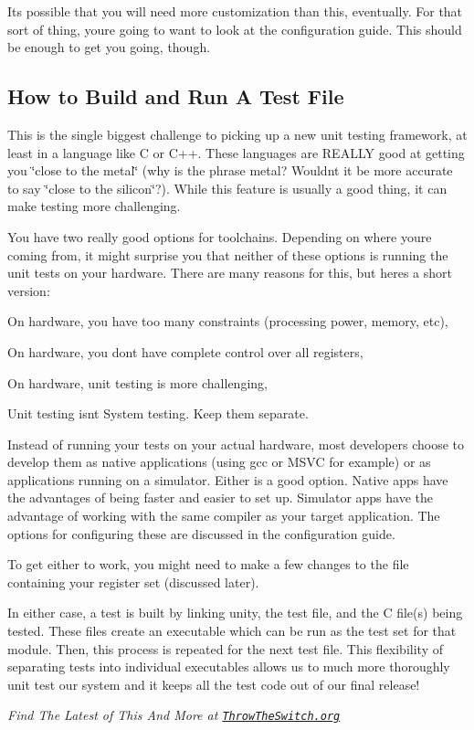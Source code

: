 It\textquotesingle{}s possible that you will need more customization than this, eventually. For that sort of thing, you\textquotesingle{}re going to want to look at the configuration guide. This should be enough to get you going, though.

\subsection*{How to Build and Run A Test File}

This is the single biggest challenge to picking up a new unit testing framework, at least in a language like C or C++. These languages are R\+E\+A\+L\+LY good at getting you \char`\"{}close to the metal\char`\"{} (why is the phrase metal? Wouldn\textquotesingle{}t it be more accurate to say \char`\"{}close to the silicon\char`\"{}?). While this feature is usually a good thing, it can make testing more challenging.

You have two really good options for toolchains. Depending on where you\textquotesingle{}re coming from, it might surprise you that neither of these options is running the unit tests on your hardware. There are many reasons for this, but here\textquotesingle{}s a short version\+:
\begin{DoxyItemize}
\item On hardware, you have too many constraints (processing power, memory, etc),
\item On hardware, you don\textquotesingle{}t have complete control over all registers,
\item On hardware, unit testing is more challenging,
\item Unit testing isn\textquotesingle{}t System testing. Keep them separate.
\end{DoxyItemize}

Instead of running your tests on your actual hardware, most developers choose to develop them as native applications (using gcc or M\+S\+VC for example) or as applications running on a simulator. Either is a good option. Native apps have the advantages of being faster and easier to set up. Simulator apps have the advantage of working with the same compiler as your target application. The options for configuring these are discussed in the configuration guide.

To get either to work, you might need to make a few changes to the file containing your register set (discussed later).

In either case, a test is built by linking unity, the test file, and the C file(s) being tested. These files create an executable which can be run as the test set for that module. Then, this process is repeated for the next test file. This flexibility of separating tests into individual executables allows us to much more thoroughly unit test our system and it keeps all the test code out of our final release!

{\itshape Find The Latest of This And More at \href{https://throwtheswitch.org}{\tt Throw\+The\+Switch.\+org}} 